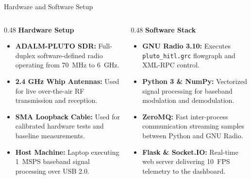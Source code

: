 \documentclass[aspectratio=169, 10pt]{beamer}
\begin{document}
\begin{frame}{Hardware and Software Setup}
  \begin{columns}[T]
    \begin{column}{0.48\linewidth}
      \textbf{\color{primaryblue}\normalsize Hardware Setup}\\[0.15cm]
      \begin{itemize}\setlength{\itemsep}{8pt}\small
        \item \textbf{ADALM-PLUTO SDR:} Full-duplex software-defined radio operating from 70~MHz to 6~GHz.
        \item \textbf{2.4 GHz Whip Antennas:} Used for live over-the-air RF transmission and reception.
        \item \textbf{SMA Loopback Cable:} Used for calibrated hardware tests and baseline measurements.
        \item \textbf{Host Machine:} Laptop executing 1~MSPS baseband signal processing over USB 2.0.
      \end{itemize}
    \end{column}
    
    \begin{column}{0.48\linewidth}
      \textbf{\color{primaryblue}\normalsize Software Stack}\\[0.15cm]
      \begin{itemize}\setlength{\itemsep}{8pt}\small
        \item \textbf{GNU Radio 3.10:} Executes \texttt{pluto\_hitl.grc} flowgraph and XML-RPC control.
        \item \textbf{Python 3 \& NumPy:} Vectorized signal processing for baseband modulation and demodulation.
        \item \textbf{ZeroMQ:} Fast inter-process communication streaming samples between Python and GNU Radio.
        \item \textbf{Flask \& Socket.IO:} Real-time web server delivering 10~FPS telemetry to the dashboard.
      \end{itemize}
    \end{column}
  \end{columns}
\end{frame}
\end{document}

